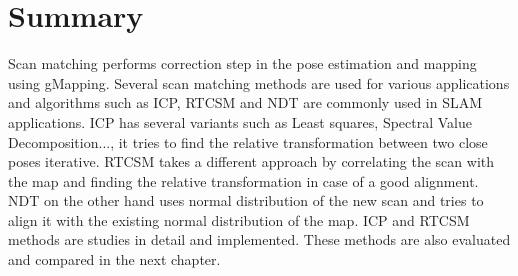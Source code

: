 \section{Summary}
Scan matching performs correction step in the pose estimation and mapping using gMapping. Several scan matching methods are used for various applications and algorithms such as ICP, RTCSM and NDT are commonly used in SLAM applications. ICP has several variants such as Least squares, Spectral Value Decomposition..., it tries to find the relative transformation between two close poses iterative. RTCSM takes a different approach by correlating the scan with the map and finding the relative transformation in case of a good alignment. NDT on the other hand uses normal distribution of the new scan and tries to align it with the existing normal distribution of the map. ICP and RTCSM methods are studies in detail and implemented. These methods are also evaluated and compared in the next chapter.